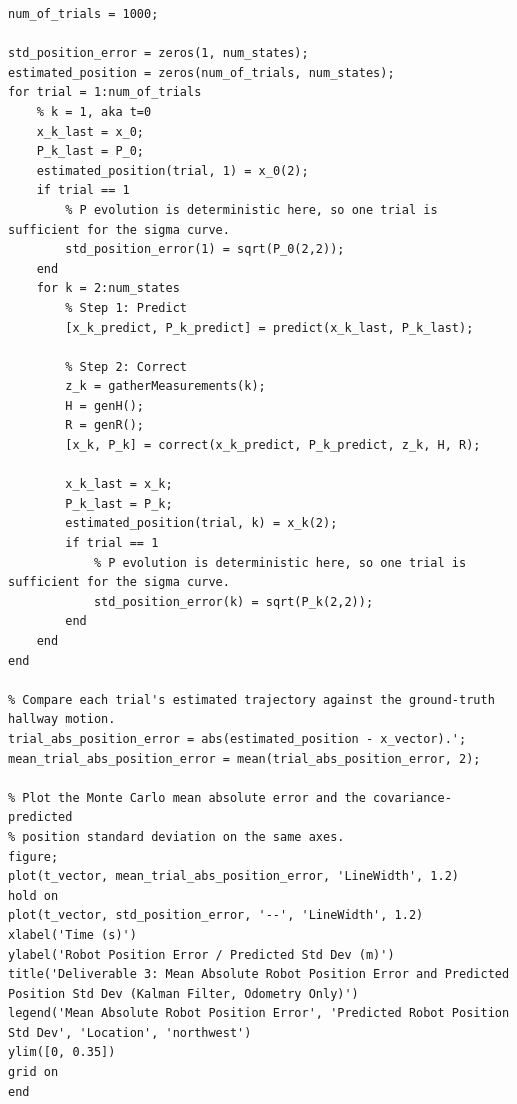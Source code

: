 \documentclass[11pt]{article}
\begin{document}
\begin{lstlisting}[caption={sim3.m}, label={lst:sim3}]
%% Deliverable 3: Odometry-Only Kalman Filter
num_of_trials = 1000;

std_position_error = zeros(1, num_states);
estimated_position = zeros(num_of_trials, num_states);
for trial = 1:num_of_trials
    % k = 1, aka t=0
    x_k_last = x_0;
    P_k_last = P_0;
    estimated_position(trial, 1) = x_0(2);
    if trial == 1
        % P evolution is deterministic here, so one trial is sufficient for the sigma curve.
        std_position_error(1) = sqrt(P_0(2,2));
    end
    for k = 2:num_states
        % Step 1: Predict
        [x_k_predict, P_k_predict] = predict(x_k_last, P_k_last);

        % Step 2: Correct
        z_k = gatherMeasurements(k);
        H = genH();
        R = genR();
        [x_k, P_k] = correct(x_k_predict, P_k_predict, z_k, H, R);

        x_k_last = x_k;
        P_k_last = P_k;
        estimated_position(trial, k) = x_k(2);
        if trial == 1
            % P evolution is deterministic here, so one trial is sufficient for the sigma curve.
            std_position_error(k) = sqrt(P_k(2,2));
        end
    end
end

% Compare each trial's estimated trajectory against the ground-truth hallway motion.
trial_abs_position_error = abs(estimated_position - x_vector).';
mean_trial_abs_position_error = mean(trial_abs_position_error, 2);

% Plot the Monte Carlo mean absolute error and the covariance-predicted
% position standard deviation on the same axes.
figure; 
plot(t_vector, mean_trial_abs_position_error, 'LineWidth', 1.2)
hold on
plot(t_vector, std_position_error, '--', 'LineWidth', 1.2)
xlabel('Time (s)')
ylabel('Robot Position Error / Predicted Std Dev (m)')
title('Deliverable 3: Mean Absolute Robot Position Error and Predicted Position Std Dev (Kalman Filter, Odometry Only)')
legend('Mean Absolute Robot Position Error', 'Predicted Robot Position Std Dev', 'Location', 'northwest')
ylim([0, 0.35])
grid on
end

\end{lstlisting}
\end{document}
